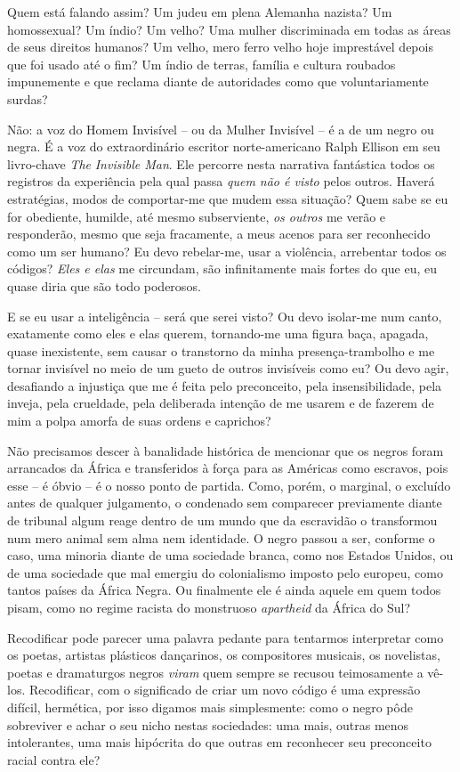 \documentclass[
  letterpaper,
  DIV=11,
  numbers=noendperiod]{scrreprt}
\begin{document}
Quem está falando assim? Um judeu em plena Alemanha nazista? Um
homossexual? Um índio? Um velho? Uma mulher discriminada em todas as
áreas de seus direitos humanos? Um velho, mero ferro velho hoje
imprestável depois que foi usado até o fim? Um índio de terras, família
e cultura roubados impunemente e que reclama diante de autoridades como
que voluntariamente surdas?

Não: a voz do Homem Invisível -- ou da Mulher Invisível -- é a de um
negro ou negra. É a voz do extraordinário escritor norte-americano Ralph
Ellison em seu livro-chave \emph{The} \emph{Invisible Man}. Ele percorre
nesta narrativa fantástica todos os registros da experiência pela qual
passa \emph{quem não é visto} pelos outros. Haverá estratégias, modos de
comportar-me que mudem essa situação? Quem sabe se eu for obediente,
humilde, até mesmo subserviente, \emph{os outros} me verão e
responderão, mesmo que seja fracamente, a meus acenos para ser
reconhecido como um ser humano? Eu devo rebelar-me, usar a violência,
arrebentar todos os códigos? \emph{Eles e elas} me circundam, são
infinitamente mais fortes do que eu, eu quase diria que são todo
poderosos.

E se eu usar a inteligência -- será que serei visto? Ou devo isolar-me
num canto, exatamente como eles e elas querem, tornando-me uma figura
baça, apagada, quase inexistente, sem causar o transtorno da minha
presença-trambolho e me tornar invisível no meio de um gueto de outros
invisíveis como eu? Ou devo agir, desafiando a injustiça que me é feita
pelo preconceito, pela insensibilidade, pela inveja, pela crueldade,
pela deliberada intenção de me usarem e de fazerem de mim a polpa amorfa
de suas ordens e caprichos?

Não precisamos descer à banalidade histórica de mencionar que os negros
foram arrancados da África e transferidos à força para as Américas como
escravos, pois esse -- é óbvio -- é o nosso ponto de partida. Como,
porém, o marginal, o excluído antes de qualquer julgamento, o condenado
sem comparecer previamente diante de tribunal algum reage dentro de um
mundo que da escravidão o transformou num mero animal sem alma nem
identidade. O negro passou a ser, conforme o caso, uma minoria diante de
uma sociedade branca, como nos Estados Unidos, ou de uma sociedade que
mal emergiu do colonialismo imposto pelo europeu, como tantos países da
África Negra. Ou finalmente ele é ainda aquele em quem todos pisam, como
no regime racista do monstruoso \emph{apartheid} da África do Sul?

Recodificar pode parecer uma palavra pedante para tentarmos interpretar
como os poetas, artistas plásticos dançarinos, os compositores musicais,
os novelistas, poetas e dramaturgos negros \emph{viram} quem sempre se
recusou teimosamente a vê-los. Recodificar, com o significado de criar
um novo código é uma expressão difícil, hermética, por isso digamos mais
simplesmente: como o negro pôde sobreviver e achar o seu nicho nestas
sociedades: uma mais, outras menos intolerantes, uma mais hipócrita do
que outras em reconhecer seu preconceito racial contra ele?
\end{document}
